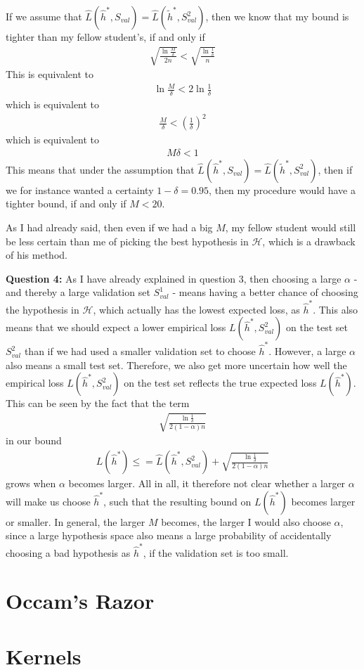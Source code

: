 \documentclass[12pt]{article}
\begin{document}
If we assume that $\hat{L}(\hat{h}^*,S_{val}) = \hat{L}(\tilde{h}^*,S_{val}^2)$, then we know that my bound is tighter than my fellow student's, if and only if
\begin{align}
\sqrt{\frac{\ln \frac{M}{\delta}}{2n}} < \sqrt{\frac{ \ln \frac{1}{\delta}}{n}} 
\end{align}
This is equivalent to
\begin{align}
\ln \frac{M}{\delta} < 2 \ln \frac{1}{\delta}
\end{align}
which is equivalent to
\begin{align}
\frac{M}{\delta} < \left( \frac{1}{\delta} \right)^2
\end{align}
which is equivalent to
\begin{align}
M \delta < 1
\end{align}
This means that under the assumption that $\hat{L}(\hat{h}^*,S_{val}) = \hat{L}(\tilde{h}^*,S_{val}^2)$, then if we for instance wanted a certainty $1-\delta = 0.95$, then my procedure would have a tighter bound, if and only if $M < 20$. 

As I had already said, then even if we had a big $M$, my fellow student would still be less certain than me of picking the best hypothesis in $\mathcal{H}$, which is a drawback of his method.

\textbf{Question 4:} As I have already explained in question 3, then choosing a large $\alpha$ - and thereby a large validation set $S_{val}^1$ - means having a better chance of choosing the hypothesis in $\mathcal{H}$, which actually has the lowest expected loss, as $\hat{h}^*$. This also means that we should expect a lower empirical loss $L(\hat{h}^*,S_{val}^2)$ on the test set $S_{val}^2$ than if we had used a smaller validation set to choose $\hat{h}^*$. However, a large $\alpha$ also means a small test set. Therefore, we also get more uncertain how well the empirical loss $L(\hat{h}^*,S_{val}^2)$ on the test set reflects the true expected loss $L(\hat{h}^*)$. This can be seen by the fact that the term
\begin{align}
\sqrt{\frac{ \ln \frac{1}{\delta}}{2(1-\alpha)n}}
\end{align}
in our bound
\begin{align}
L(\hat{h}^*) \leq = \hat{L}(\hat{h}^*, S_{val}^2) + \sqrt{\frac{ \ln \frac{1}{\delta}}{2(1-\alpha)n}}
\end{align}
grows when $\alpha$ becomes larger. All in all, it therefore not clear whether a larger $\alpha$ will make us choose $\hat{h}^*$, such that the resulting bound on $L(\hat{h}^*)$ becomes larger or smaller. In general, the larger $M$ becomes, the larger I would also choose $\alpha$, since a large hypothesis space also means a large probability of accidentally choosing a bad hypothesis as $\hat{h}^*$, if the validation set is too small.

\section{Occam's Razor}



\section{Kernels}


\end{document}
